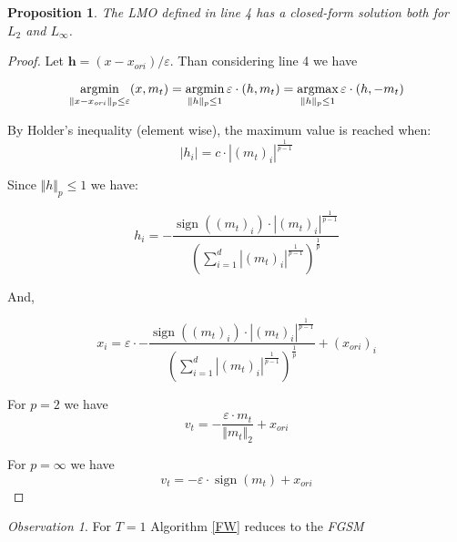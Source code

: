 \documentclass[10pt,twocolumn,letterpaper, english]{article}
\newcommand{\sign}{\mathop{\mathrm{sign}}}
\newcommand{\argmin}{\mathop{\mathrm{argmin}}}
\newcommand{\argmax}{\mathop{\mathrm{argmax}}}
\theoremstyle{definition}
\theoremstyle{plain}
\theoremstyle{plain}
\theoremstyle{plain}
\theoremstyle{plain}
\newtheorem{prop}{Proposition}[subsection]
\theoremstyle{remark}
\newtheorem{osservazione}{Observation}[section]
\theoremstyle{remark}
\theoremstyle{definition}
\theoremstyle{definition}
\theoremstyle{definition}
\theoremstyle{definition}
\renewcommand{\epsilon}{\varepsilon}
\begin{document}
\begin{prop}The LMO defined in line 4 has a closed-form solution both for $L_2$ and $L_\infty$. \\
\end{prop}
\begin{proof}
Let $\textbf{h}=(x - x_{ori})/ \epsilon$. Than considering line 4 we have

\begin{equation*}
    \argmin_{\Vert x - x_{ori} \Vert_p \le \epsilon} (x, m_t) = \argmin_{\Vert h \Vert_p \le 1} \epsilon \cdot (h,m_t)\\
    = \argmax_{\Vert h \Vert_p \le 1} \epsilon \cdot(h, -m_t)
\end{equation*}

By Holder's inequality (element wise), the maximum value is reached when: 
\begin{equation*}
    \left | h_i \right | = c \cdot \left | (m_t)_i \right |^{\frac{1}{p-1}}
\end{equation*}

Since $\Vert h \Vert_p \le 1$ we have:

\begin{equation*}
    h_i= - \frac{\sign((m_t)_i)\cdot \left | (m_t)_i \right |^{\frac{1}{p-1}}}{(\sum_{i=1}^d \left | (m_t)_i \right |^{\frac{1}{p-1}} )^{\frac{1}{p}}}
\end{equation*}

And,


\begin{equation*}
      x_i=\epsilon \cdot - \frac{\sign((m_t)_i)\cdot \left | (m_t)_i \right |^{\frac{1}{p-1}}}{(\sum_{i=1}^d \left | (m_t)_i \right |^{\frac{1}{p-1}} )^{\frac{1}{p}}} + (x_{ori})_i
\end{equation*}

For $p=2$ we have
\begin{equation*}
    v_t= - \frac{\epsilon \cdot m_t}{\Vert m_t \Vert_2} + x _{ori}
\end{equation*}

For $p= \infty$ we have
\begin{equation*}
    v_t = - \epsilon \cdot \sign(m_t) + x_{ori}
\end{equation*}
\end{proof}

\begin{osservazione}
For $T=1$ Algorithm \ref{FW} reduces to the \textit{FGSM}
\end{osservazione}
\end{document}
